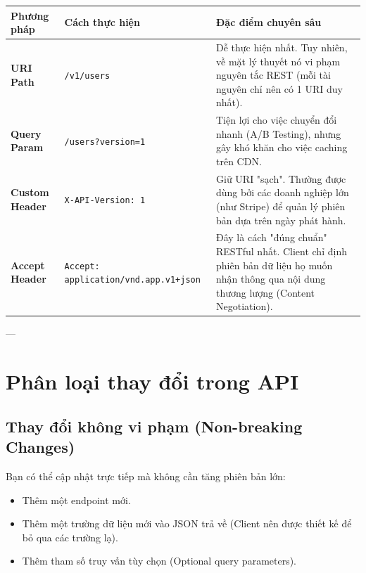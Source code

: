 \documentclass[12pt, a4paper]{article}
\begin{document}
\begin{table}[h!]
\small
\centering
\begin{tabularx}{\textwidth}{|l|X|X|}
\hline
\textbf{Phương pháp} & \textbf{Cách thực hiện} & \textbf{Đặc điểm chuyên sâu} \\ \hline
\textbf{URI Path} & \texttt{/v1/users} & Dễ thực hiện nhất. Tuy nhiên, về mặt lý thuyết nó vi phạm nguyên tắc REST (mỗi tài nguyên chỉ nên có 1 URI duy nhất). \\ \hline
\textbf{Query Param} & \texttt{/users?version=1} & Tiện lợi cho việc chuyển đổi nhanh (A/B Testing), nhưng gây khó khăn cho việc caching trên CDN. \\ \hline
\textbf{Custom Header} & \texttt{X-API-Version: 1} & Giữ URI "sạch". Thường được dùng bởi các doanh nghiệp lớn (như Stripe) để quản lý phiên bản dựa trên ngày phát hành. \\ \hline
\textbf{Accept Header} & \texttt{Accept: application/vnd.app.v1+json} & Đây là cách "đúng chuẩn" RESTful nhất. Client chỉ định phiên bản dữ liệu họ muốn nhận thông qua nội dung thương lượng (Content Negotiation). \\ \hline
\end{tabularx}
\end{table}

---

\section{Phân loại thay đổi trong API}

\subsection{Thay đổi không vi phạm (Non-breaking Changes)}
Bạn có thể cập nhật trực tiếp mà không cần tăng phiên bản lớn:
\begin{itemize}
    \item Thêm một endpoint mới.
    \item Thêm một trường dữ liệu mới vào JSON trả về (Client nên được thiết kế để bỏ qua các trường lạ).
    \item Thêm tham số truy vấn tùy chọn (Optional query parameters).
\end{itemize}
\end{document}
